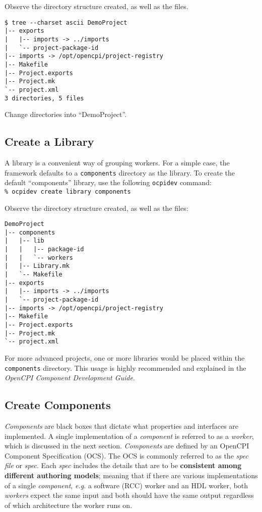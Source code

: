 Observe the directory structure created, as well as the files.\\

\bstart
\begin{verbatim}
$ tree --charset ascii DemoProject
|-- exports
|   |-- imports -> ../imports
|   `-- project-package-id
|-- imports -> /opt/opencpi/project-registry
|-- Makefile
|-- Project.exports
|-- Project.mk
`-- project.xml
3 directories, 5 files
\end{verbatim}
\bend
Change directories into ``DemoProject''.

\subsection{Create a Library}
A library is a convenient way of grouping workers. For a simple case, the framework defaults to a \verb+components+ directory as the library. To create the default ``components'' library, use the following \verb+ocpidev+ command:\\

\forceindent\verb+% ocpidev create library components+\\
\OcpidevCreate{}

\bstart
Observe the directory structure created, as well as the files:
\begin{verbatim}
DemoProject
|-- components
|   |-- lib
|   |   |-- package-id
|   |   `-- workers
|   |-- Library.mk
|   `-- Makefile
|-- exports
|   |-- imports -> ../imports
|   `-- project-package-id
|-- imports -> /opt/opencpi/project-registry
|-- Makefile
|-- Project.exports
|-- Project.mk
`-- project.xml

\end{verbatim}
\bend
For more advanced projects, one or more libraries would be placed within the \verb+components+ directory. This usage is highly recommended and explained in the \textit{OpenCPI Component Development Guide}.

\subsection{Create Components}
\textit{Components} are black boxes that dictate what properties and interfaces are implemented. A single implementation of a \textit{component} is referred to as a \textit{worker}, which is discussed in the next section. \textit{Components} are defined by an OpenCPI Component Specification (OCS). The OCS is commonly referred to as the \textit{spec file} or \textit{spec}. Each \textit{spec} includes the details that are to be \textbf{consistent among different authoring models}; meaning that if there are various implementations of a single \textit{component}, \textit{e.g.} a software (RCC) worker and an HDL worker, both \textit{workers} expect the same input and both should have the same output regardless of which architecture the worker runs on.\newline

